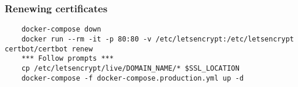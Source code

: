\subsubsection{Renewing certificates} \label{section:certificate-renewal}

\begin{verbatim}
	docker-compose down
	docker run --rm -it -p 80:80 -v /etc/letsencrypt:/etc/letsencrypt certbot/certbot renew
	*** Follow prompts ***
	cp /etc/letsencrypt/live/DOMAIN_NAME/* $SSL_LOCATION
	docker-compose -f docker-compose.production.yml up -d
\end{verbatim}
